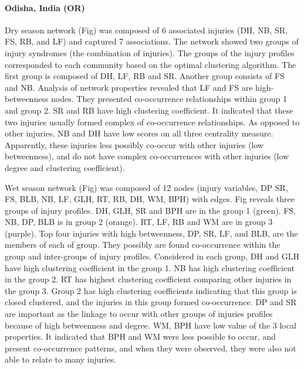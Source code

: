 %

\paragraph{Odisha, India (OR)}

Dry season network (Fig) was composed of 6 associated injuries (DH, NB, SR, FS, RB, and LF) and captured 7 associations. The network showed two groups of injury syndromes (the combination of injuries). The groups of the injury profiles corresponded to each community based on the optimal clustering algorithm. The first group is composed of DH, LF, RB and SR. Another group consists of FS and NB. Analysis of network properties revealed that LF and FS are high-betweenness nodes. They presented co-occurrence relationships within group 1 and group 2. SR and RB have high clustering coefficient. It indicated that these two injuries usually formed complex of co-occurrence relationships. As opposed to other injuries, NB and DH have low scores on all three centrality measure. Apparently, these injuries less possibly co-occur with other injuries (low betweenness), and do not have complex co-occurrences with other injuries (low degree and clustering coefficient).

Wet season network (Fig) was composed of 12 nodes (injury variables, DP SR, FS, BLB, NB, LF, GLH, RT, RB, DH, WM, BPH) with edges. Fig reveals three groups of injury profiles. DH, GLH, SR and BPH are in the group 1 (green).  FS, NB, DP, BLB is in group 2 (orange). RT, LF, RB and WM are in group 3 (purple). Top four injuries with high betweenness, DP, SR, LF, and BLB, are the members of each of group. They possibly are found co-occurrence within the group and inter-groups of injury profiles. Considered in each group, DH and GLH have high clustering coefficient in the group 1. NB has high clustering coefficient in the group 2. RT has highest clustering coefficient comparing other injuries in the group 3.  Group 2 has high clustering coefficients indicating that this group is closed clustered, and the injuries in this group formed co-occurrence.  DP and SR are important as the linkage to occur with other groups of injuries profiles because of high betweenness and degree. WM, BPH have low value of the 3 local properties. It indicated that BPH and WM were less possible to occur, and present co-occurrence patterns, and when they were observed, they were also not able to relate to many injuries. 

